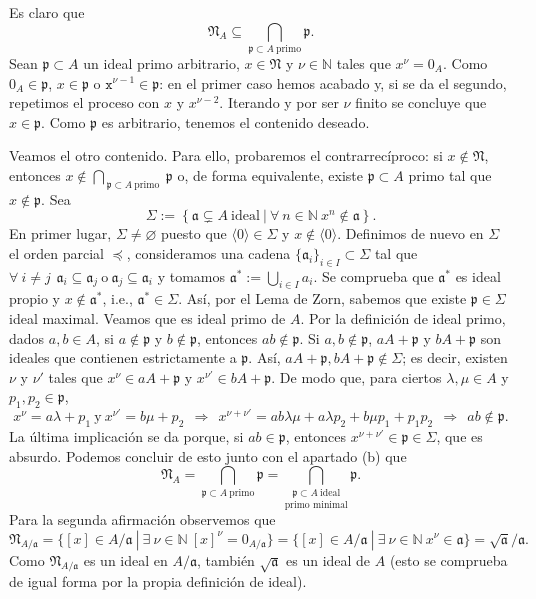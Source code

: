 \documentclass[a4paper,12pt]{article}
\newcommand{\N}{\mathbb{N}}
\newcommand{\x}{\texttt{x}}
\newcommand{\p}{\mathfrak{p}}
\newcommand{\af}{\mathfrak{a}}
\newcommand{\Nf}{\mathfrak{N}}
\begin{document}
Es claro que $$\Nf_A\subseteq\underset{\p\subset A\ \text{primo}}{\bigcap}\p.$$ Sean $\p\subset A$ un ideal primo arbitrario, $x\in\Nf$ y $\nu\in\N$ tales que $x^\nu=0_A$. Como $0_A\in\p$, $x\in\p$ o $\x^{\nu-1}\in\p$: en el primer caso hemos acabado y, si se da el segundo, repetimos el proceso con $x$ y $x^{\nu-2}$. Iterando y por ser $\nu$ finito se concluye que $x\in\p$. Como $\p$ es arbitrario, tenemos el contenido deseado.

Veamos el otro contenido. Para ello, probaremos el contrarrecíproco: si $x\notin\Nf$, entonces $x\notin\bigcap_{\ \p\subset A\ \text{primo }}\p$ o, de forma equivalente, existe $\p\subset A$ primo tal que $x\notin\p$. Sea$$\Sigma:=\left\{\af\subsetneq A\ \text{ideal}\ |\ \forall\ n\in\N\ x^n\notin\af \right\}.$$
En primer lugar, $\Sigma\neq\varnothing$ puesto que $\langle 0\rangle\in\Sigma$ y $x\notin\langle 0\rangle$.
Definimos de nuevo en $\Sigma$ el orden parcial $\preceq$, consideramos una cadena $\{\af_i\}_{i\in I}\subset\Sigma$ tal que $\forall\ i\neq j\hspace{5pt}\af_i\subseteq\af_j\ \text{o}\ \af_j\subseteq\af_i$ y tomamos $\af^*:=\bigcup_{i\in I}a_i$. Se comprueba que $\af^*$ es ideal propio y $x\notin\af^*$, i.e., $\af^*\in\Sigma$.\newline
Así, por el Lema de Zorn, sabemos que existe $\p\in\Sigma$ ideal maximal. Veamos que es ideal primo de $A$. Por la definición de ideal primo, dados $a,b\in A$, si $a\notin\p$ y $b\notin\p$, entonces $ab\notin\p$.
Si $a,b\notin\p$, $aA+\p$ y $bA+\p$ son ideales que contienen estrictamente a $\p$. Así, $aA+\p,bA+\p\notin\Sigma$; es decir, existen $\nu$ y $\nu'$ tales que $x^\nu\in aA+\p$ y $x^{\nu'}\in bA+\p$.
De modo que, para ciertos $\lambda,\mu\in A$ y $p_1,p_2\in\p$,$$x^\nu=a\lambda+p_1\ \text{y}\  x^{\nu'}=b\mu+p_2~~\Rightarrow~~ x^{\nu+\nu'}=ab\lambda\mu+a\lambda p_2+b\mu p_1+p_1p_2~~\Rightarrow~~ ab\notin\p.$$
La última implicación se da porque, si $ab\in\p$, entonces $x^{\nu+\nu'}\in\p\in\Sigma$, que es absurdo.\newline
Podemos concluir de esto junto con el apartado (b) que$$\Nf_A=\underset{\p\subset A\ \text{primo}}{\bigcap}\p=\underset{\text{primo minimal}}{\bigcap_{\p\subset A\ \text{ideal}}}\p.$$
Para la segunda afirmación observemos que$$\Nf_{A/\af}=\{[x]\in A/\af\ |\ \exists\ \nu\in\N\ {[x]}^\nu=0_{A/\af}\}=\{[x]\in A/\af\ |\ \exists\ \nu\in\N\ x^\nu\in\af\}=\sqrt{\af}/\af.$$
Como $\Nf_{A/\af}$ es un ideal en $A/\af$, también $\sqrt{\af}$ es un ideal de $A$ (esto se comprueba de igual forma por la propia definición de ideal).
\end{document}
